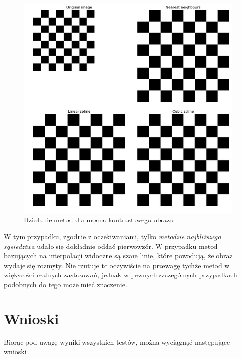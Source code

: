 \documentclass{article}
\begin{document}
\begin{figure}[ht]
    \centering
    \includegraphics[width=\textwidth]{images/chessboard-com.png}
    \caption{Działanie metod dla mocno kontrastowego obrazu}
    \label{fig:chessboard-com}
\end{figure}

W tym przypadku, zgodnie z oczekiwaniami, tylko \textit{metodzie najbliższego sąsiedztwa} udało się dokładnie oddać pierwowzór. W przypadku metod bazujących na interpolacji widoczne są szare linie, które powodują, że obraz wydaje się rozmyty. Nie rzutuje to oczywiście na przewagę tychże metod w większości realnych zastosowań, jednak w pewnych szczególnych przypadkach podobnych do tego może mieć znaczenie.

\section{Wnioski}

Biorąc pod uwagę wyniki wszystkich testów, można wyciągnąć następujące wnioski:
\end{document}
